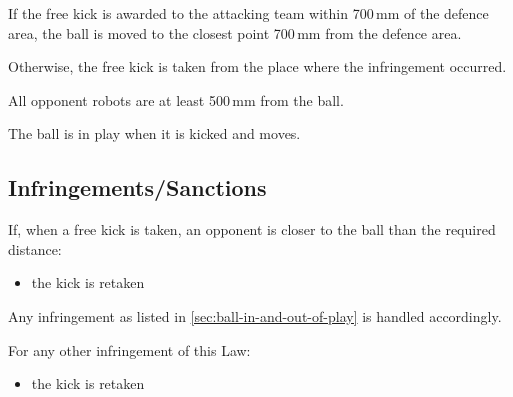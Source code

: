 If the free kick is awarded to the attacking team within 700\,mm of the defence area, the ball is moved to the closest point 700\,mm from the defence area.

Otherwise, the free kick is taken from the place where the infringement occurred.

All opponent robots are at least 500\,mm from the ball.

The ball is in play when it is kicked and moves.

\subsection{Infringements/Sanctions}
If, when a free kick is taken, an opponent is closer to the ball than the required distance:
\begin{itemize}
\item the kick is retaken
\end{itemize}

Any infringement as listed in \autoref{sec:ball-in-and-out-of-play} is handled accordingly.

For any other infringement of this Law:
\begin{itemize}
\item the kick is retaken
\end{itemize}
